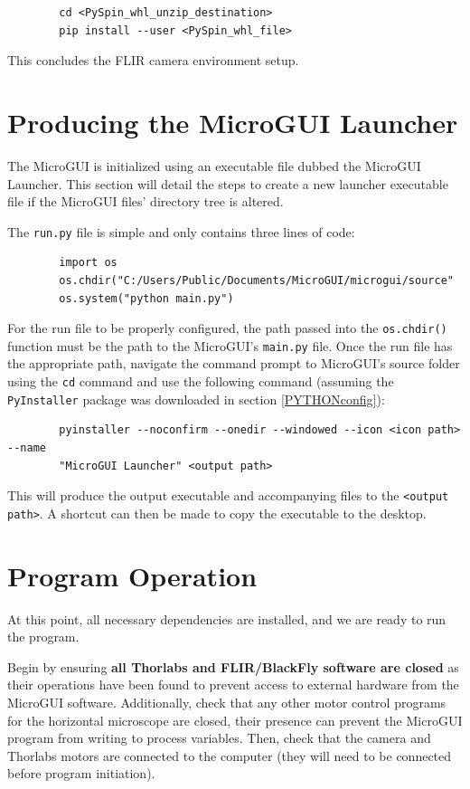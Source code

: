 \documentclass[a4paper, 12pt]{report}
\begin{document}
    \begin{verbatim}
        cd <PySpin_whl_unzip_destination>
        pip install --user <PySpin_whl_file>
    \end{verbatim}
    
    This concludes the FLIR camera environment setup.
    
    
    \section{Producing the MicroGUI Launcher}\label{launcher_exe}
    The MicroGUI is initialized using an executable file dubbed the MicroGUI Launcher. This section will detail the steps to create a new launcher executable file if the MicroGUI files' directory tree is altered.
    
    The \verb|run.py| file is simple and only contains three lines of code:
    
    \begin{verbatim}
        import os
        os.chdir("C:/Users/Public/Documents/MicroGUI/microgui/source"
        os.system("python main.py")
    \end{verbatim}
    
    For the run file to be properly configured, the path passed into the \verb|os.chdir()| function must be the path to the MicroGUI's \verb|main.py| file. Once the run file has the appropriate path, navigate the command prompt to MicroGUI's source folder using the \verb|cd| command and use the following command (assuming the \verb|PyInstaller| package was downloaded in section \ref{PYTHONconfig}):
    
    \begin{verbatim}
        pyinstaller --noconfirm --onedir --windowed --icon <icon path> --name
        "MicroGUI Launcher" <output path>
    \end{verbatim}
    
    This will produce the output executable and accompanying files to the \verb|<output path>|. A shortcut can then be made to copy the executable to the desktop.


    \section{Program Operation}
    At this point, all necessary dependencies are installed, and we are ready to run the program.
    
    Begin by ensuring \textbf{all Thorlabs and FLIR/BlackFly software are closed} as their operations have been found to prevent access to external hardware from the MicroGUI software. Additionally, check that any other motor control programs for the horizontal microscope are closed, their presence can prevent the MicroGUI program from writing to process variables. Then, check that the camera and Thorlabs motors are connected to the computer (they will need to be connected before program initiation).
    
\end{document}
